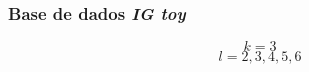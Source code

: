 \documentclass[
    12pt,                %
    oneside,            %
    a4paper,            %
    english,            %
    brazil                %
    ]{abntex2ppgsi}
\begin{document}









\subsubsection{Base de dados \textit{\textbf{IG toy}}}
\label{subsec:experiments-quant:igtoy}

$$k = 3$$
$$l = 2, 3, 4, 5, 6$$
\end{document}
